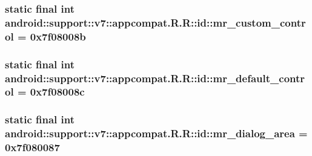 \hypertarget{classandroid_1_1support_1_1v7_1_1appcompat_1_1_r_1_1id_19fa8cc8d0655f991ab17f07eb723ccf}{
\subsubsection[{mr\_\-custom\_\-control}]{\setlength{\rightskip}{0pt plus 5cm}static final int android::support::v7::appcompat.R.R::id::mr\_\-custom\_\-control = 0x7f08008b}}
\label{classandroid_1_1support_1_1v7_1_1appcompat_1_1_r_1_1id_19fa8cc8d0655f991ab17f07eb723ccf}


\hypertarget{classandroid_1_1support_1_1v7_1_1appcompat_1_1_r_1_1id_7d1c953d19f399e1376b4d48fc4cd314}{
\subsubsection[{mr\_\-default\_\-control}]{\setlength{\rightskip}{0pt plus 5cm}static final int android::support::v7::appcompat.R.R::id::mr\_\-default\_\-control = 0x7f08008c}}
\label{classandroid_1_1support_1_1v7_1_1appcompat_1_1_r_1_1id_7d1c953d19f399e1376b4d48fc4cd314}


\hypertarget{classandroid_1_1support_1_1v7_1_1appcompat_1_1_r_1_1id_1410d64b59e848bf6221573d03a6aec1}{
\subsubsection[{mr\_\-dialog\_\-area}]{\setlength{\rightskip}{0pt plus 5cm}static final int android::support::v7::appcompat.R.R::id::mr\_\-dialog\_\-area = 0x7f080087}}
\label{classandroid_1_1support_1_1v7_1_1appcompat_1_1_r_1_1id_1410d64b59e848bf6221573d03a6aec1}


